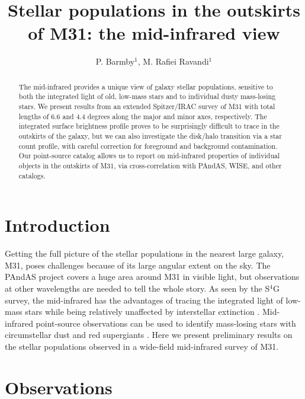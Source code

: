 \documentclass{iau}
\title[S321.~~Mid-infrared outskirts of M31] %
{Stellar populations in the outskirts of M31: the mid-infrared view}
\author[P. Barmby \& M. Rafiei Ravandi]   %
{P. Barmby$^1$, M. Rafiei Ravandi$^1$}
\affiliation{$^1$Department of Physics and Astronomy and Centre for Planetary and Space Exploration,
University of Western Ontario, London, Canada \\ email: {\tt pbarmby@uwo.ca}}
\begin{document}
\maketitle

\begin{abstract}
The mid-infrared provides a unique view of galaxy stellar populations, sensitive to both the integrated light of old, 
low-mass stars and to individual dusty mass-losing stars. We present results from an extended Spitzer/IRAC survey 
of M31 with total lengths of 6.6 and 4.4 degrees along the major and minor axes, respectively. The integrated surface 
brightness profile proves to be surprisingly difficult to trace in the outskirts of the galaxy, but we can also investigate 
the disk/halo transition via a star count profile, with careful correction for foreground and background contamination. 
Our point-source catalog allows us to report on mid-infrared properties of individual objects in the outskirts of M31, 
via cross-correlation with PAndAS, WISE, and other catalogs.

\end{abstract}

\firstsection %
\section{Introduction}

Getting the full picture of the stellar populations in the nearest large galaxy, M31, poses challenges because of its
large angular extent on the sky. The PAndAS project \cite[(McConnachie \etal\ 2009)]{pandas} covers
a huge area around M31 in visible light, but observations at other wavelengths are needed to tell the whole story.
As seen by the S$^4$G survey, the mid-infrared has the advantages of tracing the integrated light of low-mass stars while being relatively unaffected 
by interstellar extinction \cite[(Querejeta \etal\ 2015)]{q15}. Mid-infrared point-source observations can 
be used to identify  mass-losing stars with circumstellar dust \cite[(Boyer \etal\ 2015)]{boyer15} and red
supergiants \cite[(Britavskiy \etal\ 2015)]{brit15}. Here we present preliminary results on the stellar populations
observed in a wide-field mid-infrared survey of M31.

\section{Observations}
\end{document}
